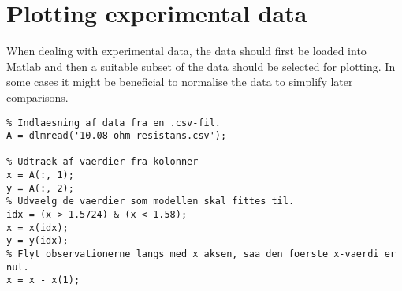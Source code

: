 \section{Plotting experimental data}

When dealing with experimental data, the data should
first be loaded into Matlab and then a suitable
subset of the data should be selected for plotting.
In some cases it might be beneficial to normalise the 
data to simplify later comparisons.

\begin{lstlisting}
% Indlaesning af data fra en .csv-fil.
A = dlmread('10.08 ohm resistans.csv');

% Udtraek af vaerdier fra kolonner
x = A(:, 1);
y = A(:, 2);
% Udvaelg de vaerdier som modellen skal fittes til.
idx = (x > 1.5724) & (x < 1.58);
x = x(idx);
y = y(idx);
% Flyt observationerne langs med x aksen, saa den foerste x-vaerdi er nul.
x = x - x(1);
\end{lstlisting}
